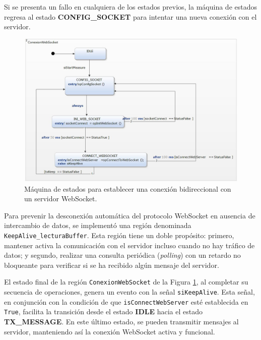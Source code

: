 Si se presenta un fallo en cualquiera de los estados previos, la máquina de estados regresa al estado \textbf{CONFIG\_SOCKET} para intentar una nueva conexión con el servidor.

\begin{figure}[H]
    \centering
    \includegraphics[width=0.9\linewidth]{Figuras/datalogger/Firmware/connectWebSocket.jpg}
    \caption{Máquina de estados para establecer una conexión bidireccional con un servidor WebSocket.}
    \label{fig:connectWebSocket}
\end{figure}

Para prevenir la desconexión automática del protocolo WebSocket en ausencia de intercambio de datos, se implementó una región denominada \texttt{KeepAlive\_lecturaBuffer}. Esta región tiene un doble propósito: primero, mantener activa la comunicación con el servidor incluso cuando no hay tráfico de datos; y segundo, realizar una consulta periódica (\textit{polling}) con un retardo no bloqueante para verificar si se ha recibido algún mensaje del servidor.

El estado final de la región \texttt{ConexionWebSocket} de la Figura \ref{fig:connectWebSocket}, al completar su secuencia de operaciones, genera un evento con la señal \texttt{siKeepAlive}. Esta señal, en conjunción con la condición de que \texttt{isConnectWebServer} esté establecida en \texttt{True}, facilita la transición desde el estado \textbf{IDLE} hacia el estado \textbf{TX\_MESSAGE}. En este último estado, se pueden transmitir mensajes al servidor, manteniendo así la conexión WebSocket activa y funcional.



